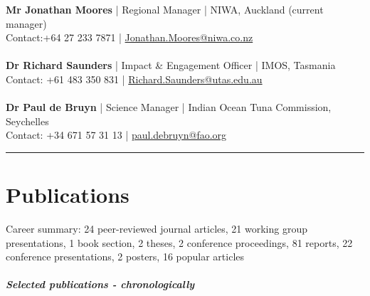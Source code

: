 \documentclass[10pt,a4paper]{article}
\begin{document}
\textbf{Mr Jonathan Moores} | Regional Manager | NIWA, Auckland (current manager)\\
Contact:+64 27 233 7871 | \href{mailto:Jonathan.Moores@niwa.co.nz}{Jonathan.Moores@niwa.co.nz}\\
\\
\textbf{Dr Richard Saunders} | Impact \& Engagement Officer | IMOS, Tasmania\\
Contact: +61 483 350 831 | \href{mailto:Richard.Saunders@utas.edu.au}{Richard.Saunders@utas.edu.au}\\
\\
\noindent
\textbf{Dr Paul de Bruyn} | Science Manager | Indian Ocean Tuna Commission, Seychelles\\
Contact: +34 671 57 31 13 | \href{mailto:paul.debruyn@fao.org}{paul.debruyn@fao.org}\\

\hrule
\newpage
\vspace{6pt}
\noindent
\section*{Publications}

Career summary: 24 peer-reviewed journal articles, 21 working group presentations, 1 book section, 2 theses, 2 conference proceedings, 81 reports, 22 conference presentations, 2 posters, 16 popular articles\\ 
\\
\textit{\textbf{Selected publications - chronologically}}\\
\end{document}

